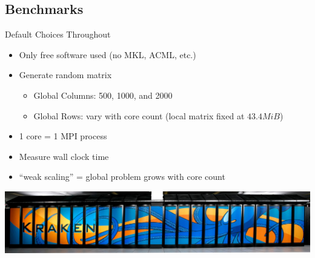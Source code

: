 \subsection{Benchmarks}
\makesubcontentsslidessec

\begin{frame}
  \begin{block}{Default Choices Throughout}
    \begin{itemize}[<+-|alert@+>]
      \item Only free software used (no MKL, ACML, etc.)
      \item Generate random matrix
        \begin{itemize}
        \item Global Columns: 500, 1000, and 2000
        \item Global Rows: vary with core count (local matrix fixed at
          $43.4 MiB$)
        \end{itemize}
      \item 1 core = 1 MPI process
      \item Measure wall clock time
      \item ``weak scaling'' = global problem grows with core count
    \end{itemize}
    \vspace{.8cm}
    \centering\includegraphics{../common/pics/krakenWide}
  \end{block}
\end{frame}

